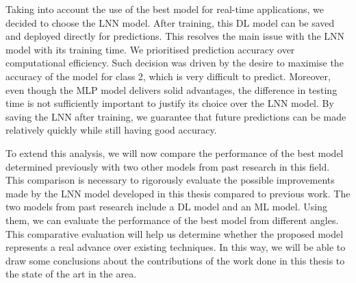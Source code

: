 \documentclass[12pt,oneside]{book} %
\begin{document}
\noindent Taking into account the use of the best model for real-time applications, we decided to choose the LNN model. After training, this DL model can be saved and deployed directly for predictions. This resolves the main issue with the LNN model with its training time. We prioritised prediction accuracy over computational efficiency. Such decision was driven by the desire to maximise the accuracy of the model for class 2, which is very difficult to predict. Moreover, even though the MLP model delivers solid advantages, the difference in testing time is not sufficiently important to justify its choice over the LNN model. By saving the LNN after training, we guarantee that future predictions can be made relatively quickly while still having good accuracy.

\noindent To extend this analysis, we will now compare the performance of the best model determined previously with two other models from past research in this field. This comparison is necessary to rigorously evaluate the possible improvements made by the LNN model developed in this thesis compared to previous work. The two models from past research include a DL model and an ML model. Using them, we can evaluate the performance of the best model from different angles. This comparative evaluation will help us determine whether the proposed model represents a real advance over existing techniques. In this way, we will be able to draw some conclusions about the contributions of the work done in this thesis to the state of the art in the area.
\end{document}
